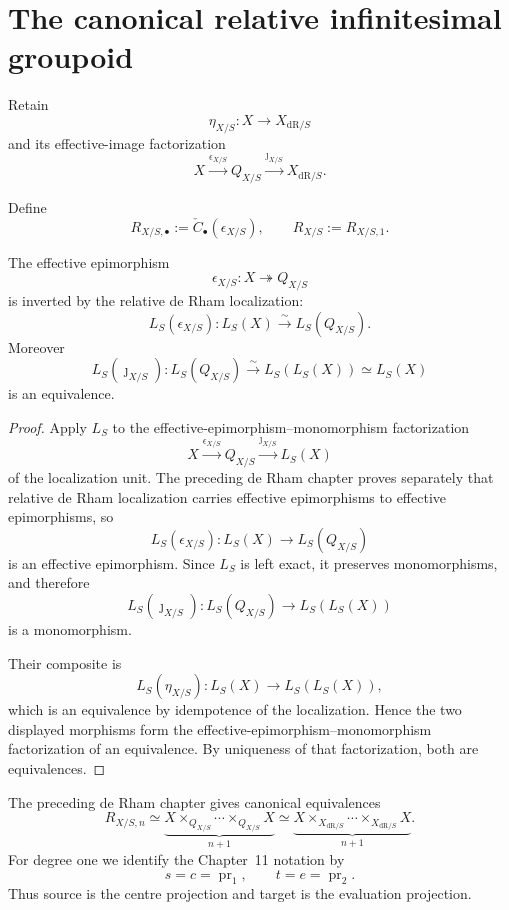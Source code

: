 \section{The canonical relative infinitesimal groupoid}
\label{sec:flg-canonical-relation}

Retain
\[
    \eta_{X/S}:X\to X_{\mathrm{dR}/S}
\]
and its effective-image factorization
\[
    X\xrightarrow{\epsilon_{X/S}}Q_{X/S}
      \xrightarrow{\jmath_{X/S}}X_{\mathrm{dR}/S}.
\]

\begin{definition}
\label{def:canonical-relative-infinitesimal-groupoid}
Define
\[
    R_{X/S,\bullet}
    :=
    \check C_\bullet(\epsilon_{X/S}),
    \qquad
    R_{X/S}:=R_{X/S,1}.
\]
\end{definition}

\begin{lemma}
\label{lem:effective-quotient-dr-equivalence}
The effective epimorphism
\[
    \epsilon_{X/S}:X\twoheadrightarrow Q_{X/S}
\]
is inverted by the relative de Rham localization:
\[
    L_S(\epsilon_{X/S}):
    L_S(X)\xrightarrow{\sim}L_S(Q_{X/S}).
\]
Moreover
\[
    L_S(\jmath_{X/S}):
    L_S(Q_{X/S})
    \xrightarrow{\sim}
    L_S(L_S(X))
    \simeq
    L_S(X)
\]
is an equivalence.
\end{lemma}

\begin{proof}
Apply $L_S$ to the effective-epimorphism--monomorphism factorization
\[
    X\xrightarrow{\epsilon_{X/S}}Q_{X/S}
      \xrightarrow{\jmath_{X/S}}L_S(X)
\]
of the localization unit.  The preceding de Rham chapter proves separately
that relative de Rham localization carries effective epimorphisms to
effective epimorphisms, so
\[
    L_S(\epsilon_{X/S}):
    L_S(X)\longrightarrow L_S(Q_{X/S})
\]
is an effective epimorphism.  Since $L_S$ is left exact, it preserves
monomorphisms, and therefore
\[
    L_S(\jmath_{X/S}):
    L_S(Q_{X/S})\longrightarrow L_S(L_S(X))
\]
is a monomorphism.

Their composite is
\[
    L_S(\eta_{X/S}):
    L_S(X)\longrightarrow L_S(L_S(X)),
\]
which is an equivalence by idempotence of the localization.  Hence the two
displayed morphisms form the effective-epimorphism--monomorphism
factorization of an equivalence.  By uniqueness of that factorization, both
are equivalences.
\end{proof}

The preceding de Rham chapter gives canonical equivalences
\[
    R_{X/S,n}
    \simeq
    \underbrace{
    X\times_{Q_{X/S}}\cdots\times_{Q_{X/S}}X
    }_{n+1}
    \simeq
    \underbrace{
    X\times_{X_{\mathrm{dR}/S}}\cdots
      \times_{X_{\mathrm{dR}/S}}X
    }_{n+1}.
\]
For degree one we identify the Chapter~11 notation by
\[
    s=c=\operatorname{pr}_1,
    \qquad
    t=e=\operatorname{pr}_2.
\]
Thus source is the centre projection and target is the evaluation projection.

